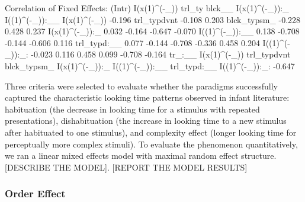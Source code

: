 \documentclass[10pt, letterpaper]{article}
\newenvironment{CodeChunk}{}{}
\begin{document}
\begin{CodeChunk}
\begin{CodeOutput}
Correlation of Fixed Effects:
               (Intr) I(x(1)^(-_)) trl_ty blck__ I(x(1)^(-_)):_ I((1)^(-_)):__
I(x(1)^(-_))   -0.196                                                         
trl_typdvnt    -0.108  0.203                                                  
blck_typsm_    -0.228  0.428        0.237                                     
I(x(1)^(-_)):_  0.032 -0.164       -0.647 -0.070                              
I((1)^(-_)):__  0.138 -0.708       -0.144 -0.606  0.116                       
trl_typd:__     0.077 -0.144       -0.708 -0.336  0.458          0.204        
I((1)^(-_)):_: -0.023  0.116        0.458  0.099 -0.708         -0.164        
               tr_:__
I(x(1)^(-_))         
trl_typdvnt          
blck_typsm_          
I(x(1)^(-_)):_       
I((1)^(-_)):__       
trl_typd:__          
I((1)^(-_)):_: -0.647
\end{CodeOutput}
\end{CodeChunk}

Three criteria were selected to evaluate whether the paradigms
successfully captured the characteristic looking time patterns observed
in infant literature: habituation (the decrease in looking time for a
stimulus with repeated presentations), dishabituation (the increase in
looking time to a new stimulus after habituated to one stimulus), and
complexity effect (longer looking time for perceptually more complex
stimuli). To evaluate the phenomenon quantitatively, we ran a linear
mixed effects model with maximal random effect structure. {[}DESCRIBE
THE MODEL{]}. {[}REPORT THE MODEL RESULTS{]}

\hypertarget{order-effect}{%
\subsubsection{Order Effect}\label{order-effect}}
\end{document}
